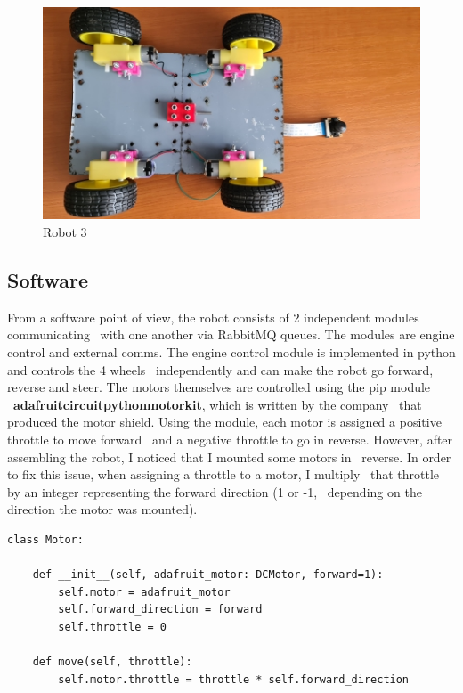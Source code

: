 \begin{figure}[ht]
    \label{fig:robot3}
    \includegraphics[keepaspectratio]{img/robot3d.jpg}
    \caption{Robot 3}
\end{figure}


\subsection{Software}
\label{subsec:implementation-robot-software}

From a software point of view, the robot consists of 2 independent modules communicating \
with one another via RabbitMQ queues.
The modules are engine control and external comms.
The engine control module is implemented in python and controls the 4 wheels \
independently and can make the robot go forward, reverse and steer.
The motors themselves are controlled using the pip module \
\textbf{adafruit\-circuitpython\-motorkit}, which is written by the company \
that produced the motor shield.
Using the module, each motor is assigned a positive throttle to move forward \
and a negative throttle to go in reverse.
However, after assembling the robot, I noticed that I mounted some motors in \
reverse.
In order to fix this issue, when assigning a throttle to a motor, I multiply \
that throttle by an integer representing the forward direction (1 or -1, \
depending on the direction the motor was mounted).
\begin{verbatim}
class Motor:

    def __init__(self, adafruit_motor: DCMotor, forward=1):
        self.motor = adafruit_motor
        self.forward_direction = forward
        self.throttle = 0

    def move(self, throttle):
        self.motor.throttle = throttle * self.forward_direction
\end{verbatim}

